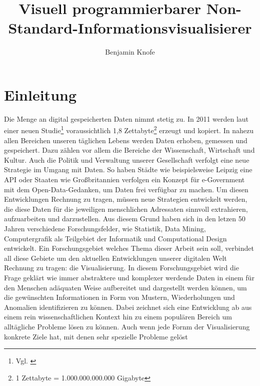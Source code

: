 \documentclass[a4paper, 12pt, onepage, pdftex, headsepline, footsepline]{scrreprt}
\begin{document}
\title{Visuell programmierbarer Non-Standard-Informationsvisualisierer}
\author{Benjamin Knofe}
\subject{Diplomarbeit}
\publishers{Hochschule für Technik, Wirtschaft und Kultur Leipzig}
\dedication{viele nette Leute}
\maketitle
\tableofcontents
\chapter{Einleitung}
\label{sec:Einleitung}

Die Menge an digital gespeicherten Daten nimmt stetig zu. In 2011 werden laut einer neuen Studie\footnote{Vgl. \citep{EMC}}
voraussichtlich 1,8 Zettabyte\footnote{1 Zettabyte = 1.000.000.000.000 Gigabyte}
erzeugt und kopiert. In nahezu allen Bereichen unseren
täglichen Lebens werden Daten erhoben, gemessen und gespeichert. Dazu zählen vor allem die Bereiche
der Wissenschaft, Wirtschaft und Kultur. Auch die Politik und Verwaltung unserer Gesellschaft
verfolgt eine neue Strategie im Umgang mit Daten. So haben Städte wie beispielsweise Leipzig eine 
API oder Staaten wie Großbritannien verfolgen ein Konzept für e-Government mit dem
Open-Data-Gedanken, um Daten frei verfügbar zu machen. Um diesen Entwicklungen Rechnung zu tragen,
müssen neue Strategien entwickelt werden, die diese Daten für die jeweiligen menschlichen Adressaten
sinnvoll extrahieren, aufzuarbeiten und darzustellen. Aus diesem Grund haben sich in den letzen 50
Jahren verschiedene Forschungsfelder, wie Statistik, Data Mining, Computergrafik als Teilgebiet der
Informatik und Computational Design entwickelt. Ein Forschungsgebiet welches Thema dieser Arbeit
sein soll, verbindet all diese Gebiete um den aktuellen Entwicklungen unserer digitalen Welt
Rechnung zu tragen: die Visualisierung. In diesem Forschungsgebiet wird die Frage geklärt wie immer
abstraktere und komplexer werdende Daten in einem für den Menschen adäquaten Weise aufbereitet und
dargestellt werden können, um die gewünschten Informationen in Form von Mustern, Wiederholungen und
Anomalien identifizieren zu können. Dabei zeichnet sich eine Entwicklung ab aus einem rein
wissenschaftlichen Kontext hin zu einem populären Bereich um alltägliche Probleme lösen zu können.
Auch wenn jede Fornm der Visualisierung konkrete Ziele hat, mit denen sehr spezielle Probleme gelöst
\end{document}
